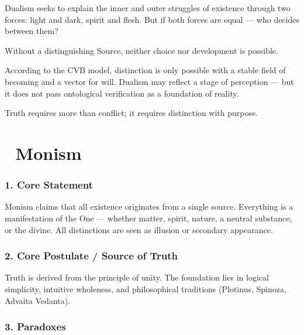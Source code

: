 \documentclass[12pt]{article}
\begin{document}
Dualism seeks to explain the inner and outer struggles of existence through two forces: light and dark, spirit and flesh. But if both forces are equal — who decides between them?

Without a distinguishing Source, neither choice nor development is possible.

According to the CVB model, distinction is only possible with a stable field of becoming and a vector for will. Dualism may reflect a stage of perception — but it does not pass ontological verification as a foundation of reality.

Truth requires more than conflict; it requires distinction with purpose.

\section*{🔷 Monism}

\subsubsection*{1. Core Statement}

Monism claims that all existence originates from a single source. Everything is a manifestation of the One — whether matter, spirit, nature, a neutral substance, or the divine. All distinctions are seen as illusion or secondary appearance.

\subsubsection*{2. Core Postulate / Source of Truth}

Truth is derived from the principle of unity. The foundation lies in logical simplicity, intuitive wholeness, and philosophical traditions (Plotinus, Spinoza, Advaita Vedanta).

\subsubsection*{3. Paradoxes}
\end{document}
